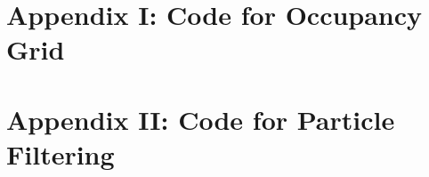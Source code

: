\documentclass{article} %
\begin{document}
\clearpage
\section*{Appendix I: Code for Occupancy Grid}


\clearpage
\section*{Appendix II: Code for Particle Filtering}

\end{document}
